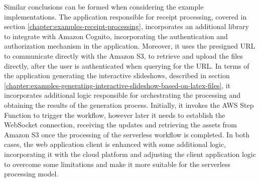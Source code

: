 Similar conclusions can be formed when considering the example implementations.
The application responsible for receipt processing, covered in section \ref{chapter:examples-receipt-processing}, incorporates an additional library to integrate with Amazon Cognito, incorporating the authentication and authorization mechanism in the application.
Moreover, it uses the presigned URL to communicate directly with the Amazon S3, to retrieve and upload the files directly, after the user is authenticated when querying for the URL.
In terms of the application generating the interactive slideshows, described in section \ref{chapter:examples-generating-interactive-slideshow-based-on-latex-files}, it incorporates additional logic responsible for orchestrating the processing and obtaining the results of the generation process.
Initially, it invokes the AWS Step Function to trigger the workflow, however later it needs to establish the WebSocket connection, receiving the updates and retrieving the assets from Amazon S3 once the processing of the serverless workflow is completed.
In both cases, the web application client is enhanced with some additional logic, incorporating it with the cloud platform and adjusting the client application logic to overcome some limitations and make it more suitable for the serverless processing model.